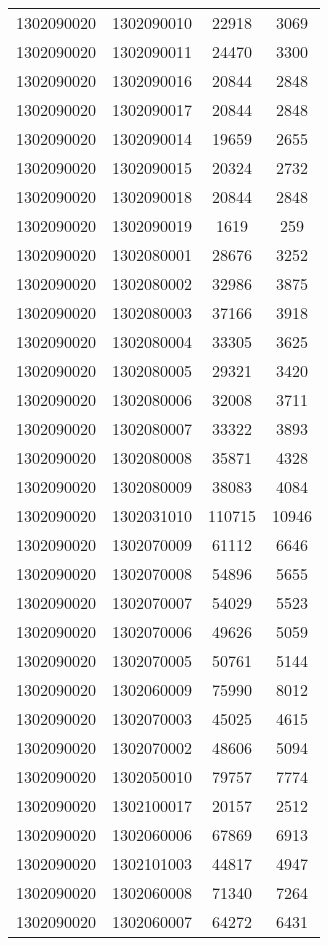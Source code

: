 \begin{longtable}[h]{llcc}
		1302090020 & 1302090010 & 22918 & 3069\\
		1302090020 & 1302090011 & 24470 & 3300\\
		1302090020 & 1302090016 & 20844 & 2848\\
		1302090020 & 1302090017 & 20844 & 2848\\
		1302090020 & 1302090014 & 19659 & 2655\\
		1302090020 & 1302090015 & 20324 & 2732\\
		1302090020 & 1302090018 & 20844 & 2848\\
		1302090020 & 1302090019 & 1619 & 259\\
		1302090020 & 1302080001 & 28676 & 3252\\
		1302090020 & 1302080002 & 32986 & 3875\\
		1302090020 & 1302080003 & 37166 & 3918\\
		1302090020 & 1302080004 & 33305 & 3625\\
		1302090020 & 1302080005 & 29321 & 3420\\
		1302090020 & 1302080006 & 32008 & 3711\\
		1302090020 & 1302080007 & 33322 & 3893\\
		1302090020 & 1302080008 & 35871 & 4328\\
		1302090020 & 1302080009 & 38083 & 4084\\
		1302090020 & 1302031010 & 110715 & 10946\\
		1302090020 & 1302070009 & 61112 & 6646\\
		1302090020 & 1302070008 & 54896 & 5655\\
		1302090020 & 1302070007 & 54029 & 5523\\
		1302090020 & 1302070006 & 49626 & 5059\\
		1302090020 & 1302070005 & 50761 & 5144\\
		1302090020 & 1302060009 & 75990 & 8012\\
		1302090020 & 1302070003 & 45025 & 4615\\
		1302090020 & 1302070002 & 48606 & 5094\\
		1302090020 & 1302050010 & 79757 & 7774\\
		1302090020 & 1302100017 & 20157 & 2512\\
		1302090020 & 1302060006 & 67869 & 6913\\
		1302090020 & 1302101003 & 44817 & 4947\\
		1302090020 & 1302060008 & 71340 & 7264\\
		1302090020 & 1302060007 & 64272 & 6431\\

\end{longtable}
